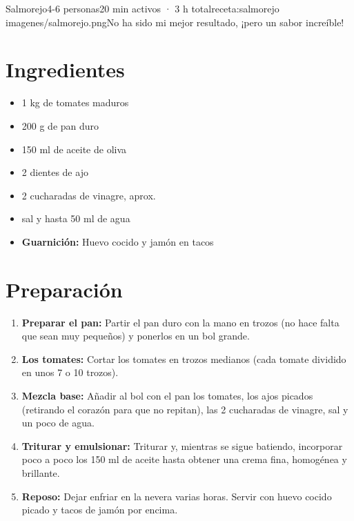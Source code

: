 \begin{recetaConImagen}{Salmorejo}{4-6 personas}{20 min activos · 3 h total}{receta:salmorejo}
    {imagenes/salmorejo.png}{No ha sido mi mejor resultado, ¡pero un sabor increíble!}
    
    \begin{minipage}[t]{0.35\textwidth}
        \section*{Ingredientes}
        \begin{itemize}[leftmargin=*]
            \item 1 kg de tomates maduros
            \item 200 g de pan duro
            \item 150 ml de aceite de oliva
            \item 2 dientes de ajo
            \item 2 cucharadas de vinagre, aprox.
            \item sal y hasta 50 ml de agua
            \item \textbf{Guarnición:} Huevo cocido y jamón en tacos
        \end{itemize}
    \end{minipage}
    \hfill
    \begin{minipage}[t]{0.6\textwidth}
        \section*{Preparación}
        \begin{enumerate}
            \item \textbf{Preparar el pan:} Partir el pan duro con la mano en trozos (no hace falta que sean muy pequeños) y ponerlos en un bol grande.
            \item \textbf{Los tomates:} Cortar los tomates en trozos medianos (cada tomate dividido en unos 7 o 10 trozos).
            \item \textbf{Mezcla base:} Añadir al bol con el pan los tomates, los ajos picados (retirando el corazón para que no repitan), las 2 cucharadas de vinagre, sal y un poco de agua.
            \item \textbf{Triturar y emulsionar:} Triturar y, mientras se sigue batiendo, incorporar poco a poco los 150 ml de aceite hasta obtener una crema fina, homogénea y brillante.
            \item \textbf{Reposo:} Dejar enfriar en la nevera varias horas. Servir con huevo cocido picado y tacos de jamón por encima.
        \end{enumerate}
    \end{minipage}

\end{recetaConImagen}
